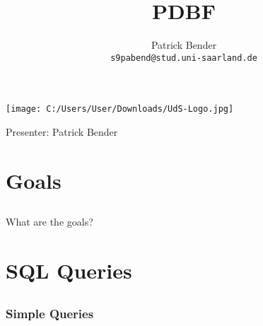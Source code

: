 \documentclass[10pt]{beamer}
\title{PDBF}
\author{
 Patrick Bender\\
  \texttt{s9pabend@stud.uni-saarland.de}
}
\date{}
\begin{document}
\begin{frame}
\vspace{-1.0cm}
\titlepage
\vspace{-2.5cm}
\begin{center}
\texttt{[image: C:/Users/User/Downloads/UdS-Logo.jpg]}
\end{center}
Presenter: Patrick Bender
\end{frame}

\section{Goals} 
\subsection*{}
\vspace{1.0cm}
\begin{frame}
	\begin{Large}\begin{center}What are the goals?\end{center}\end{Large}
\end{frame}

\section{SQL Queries} 
\subsection*{}
\begin{frame}\frametitle{Simple Queries} 
	\\[12pt]
	\\[12pt]
	\\
\end{frame}
\end{document}
